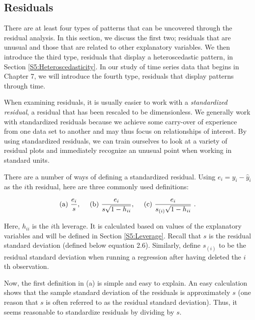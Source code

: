 
\subsection{Residuals}\label{S5:Residuals}

There are at least four types of patterns that can be uncovered
through the residual analysis. In this section, we discuss the first
two; residuals that are unusual and those that are related to other
explanatory variables. We then introduce the third type, residuals
that display a heteroscedastic pattern, in Section
\ref{S5:Heteroscedasticity}. In our study of time series data that
begins in Chapter 7, we will introduce the fourth type, residuals
that display patterns through time.

When examining residuals, it is usually easier to work with a \textit{%
standardized residual}, a residual that has been rescaled to be
dimensionless. We generally work with standardized residuals because
we achieve some carry-over of experience from one data set to
another and may thus focus on relationships of interest. By using
standardized residuals, we can train ourselves to look at a variety
of residual plots and immediately recognize an unusual point when
working in standard units.

There are a number of ways of defining a standardized residual.
Using $e_i = y_{i}-\hat{y}_{i}$ as the $i$th residual, here are
three commonly used definitions:

\begin{equation} \label{E5:StdResid}
\text{(a) }\frac{e_i}{s},\text{ \ \ \ (b) }\frac{e_i}{s\sqrt{%
1-h_{ii}}}, \text { \  \   \   }\text{(c)
}\frac{e_i}{s_{(i)}\sqrt{1-h_{ii}}}\text{\ }.
\end{equation}

\noindent Here, $h_{ii}$ is the $i$th leverage. It is calculated
based on values of the explanatory variables and will be defined in
Section \ref{S5:Leverage}. Recall that $ s $ is the residual
standard deviation (defined below equation 2.6). Similarly, define
$s_{(i)}$ to be the residual standard deviation when running a
regression after having deleted the $i$th observation.

Now, the first definition in (a) is simple and easy to explain. An
easy calculation shows that the sample standard deviation of the
residuals is approximately $s$ (one reason that $s$ is often
referred to as the residual standard deviation). Thus, it seems
reasonable to standardize residuals by dividing by $s$.

